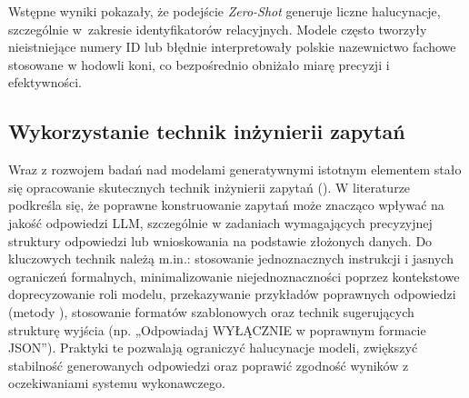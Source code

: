 Wstępne wyniki pokazały, że podejście \textit{Zero-Shot} generuje liczne halucynacje, szczególnie w~zakresie identyfikatorów relacyjnych. Modele często tworzyły nieistniejące numery ID lub błędnie interpretowały polskie nazewnictwo fachowe stosowane w hodowli koni, co bezpośrednio obniżało miarę precyzji i efektywności. 

\subsection{Wykorzystanie technik inżynierii zapytań}

Wraz z rozwojem badań nad modelami generatywnymi istotnym elementem stało się opracowanie skutecznych technik inżynierii zapytań (). W literaturze \cite{liu2023pre,liu2023prompting} podkreśla się, że poprawne konstruowanie zapytań może znacząco wpływać na jakość odpowiedzi LLM, szczególnie w zadaniach wymagających precyzyjnej struktury odpowiedzi lub wnioskowania na podstawie złożonych danych. Do kluczowych technik należą m.in.: stosowanie jednoznacznych instrukcji i jasnych ograniczeń formalnych, minimalizowanie niejednoznaczności poprzez kontekstowe doprecyzowanie roli modelu, przekazywanie przykładów poprawnych odpowiedzi (metody ), stosowanie formatów szablonowych oraz technik sugerujących strukturę wyjścia (np. „Odpowiadaj WYŁĄCZNIE w poprawnym formacie JSON”). Praktyki te pozwalają ograniczyć halucynacje modeli, zwiększyć stabilność generowanych odpowiedzi oraz poprawić zgodność wyników z oczekiwaniami systemu wykonawczego.

